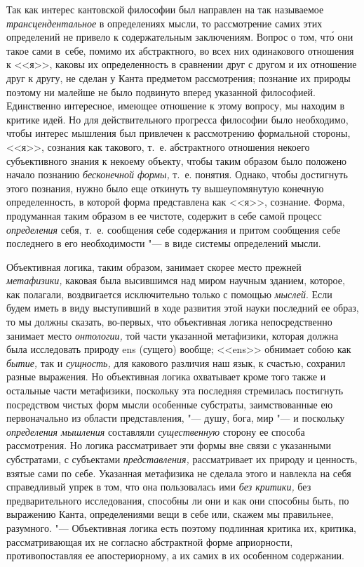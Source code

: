Так как интерес кантовской философии был направлен на так называемое
{\em трансцендентальное} в определениях мысли, то
рассмотрение самих этих определений не привело к содержательным
заключениям. Вопрос о том, чт\'{о} они такое сами в~себе, помимо их
абстрактного, во всех них одинакового отношения к <<я>>, каковы их
определенность в сравнении друг с другом и их отношение друг к другу, не
сделан у Канта предметом рассмотрения; познание их природы поэтому ни
малейше не было подвинуто вперед указанной философией. Единственно
интересное, имеющее отношение к этому вопросу, мы находим в критике идей.
Но для действительного прогресса философии было необходимо, чтобы интерес
мышления был привлечен к рассмотрению формальной стороны, <<я>>, сознания как
такового, т.~е. абстрактного отношения некоего субъективного знания к
некоему объекту, чтобы таким образом было положено начало познанию
{\em бесконечной формы,} т.~е. понятия. Однако, чтобы
достигнуть этого познания, нужно было еще откинуть ту вышеупомянутую
конечную определенность, в которой форма представлена как <<я>>, сознание.
Форма, продуманная таким образом в ее чистоте, содержит в себе самой
процесс {\em определения} себя, т.~е. сообщения себе
содержания и притом сообщения себе последнего в его необходимости "--- в виде
системы определений мысли.

Объективная логика, таким образом, занимает скорее место прежней
{\em метафизики,} каковая была высившимся над миром
научным зданием, которое, как полагали, воздвигается исключительно только с
помощью {\em мыслей}. Если будем иметь в виду
выступивший в ходе развития этой науки последний ее
образ,
то мы должны сказать, во-первых, что объективная логика непосредственно
занимает место {\em онтологии,} той части указанной
метафизики, которая должна была исследовать природу ens (сущего) вообще;
<<ens>> обнимает собою как {\em бытие,} так и
{\em сущность,} для какового различия наш язык, к
счастью, сохранил разные выражения. Но объективная логика охватывает кроме
того также и остальные части метафизики, поскольку эта последняя стремилась
постигнуть посредством чистых форм мысли особенные субстраты,
заимствованные ею первоначально из области представления, "--- душу, бога,
мир "--- и поскольку {\em определения мышления} составляли
{\em существенную} сторону ее способа рассмотрения. Но
логика рассматривает эти формы вне связи с указанными субстратами, с
субъектами {\em представления,} рассматривает их
природу и ценность, взятые сами по себе. Указанная метафизика не сделала
этого и навлекла на себя справедливый упрек в том, что она пользовалась ими
{\em без критики,} без предварительного исследования,
способны ли они и как они способны быть, по выражению Канта, определениями
вещи в себе или, скажем мы правильнее, разумного. "--- Объективная логика есть
поэтому подлинная критика их, критика, рассматривающая их не согласно
абстрактной форме априорности, противопоставляя ее апостериорному, а их
самих в их особенном содержании.

